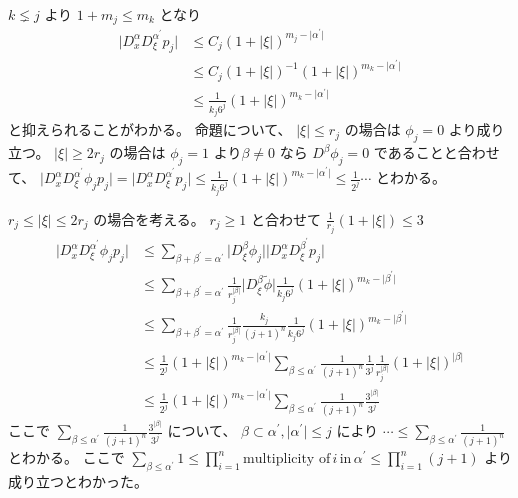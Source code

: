 \begin{Proof}
\itemprof
  \(k \lneq j\) より \(1 + m_j \leq m_k\) となり
  \begin{align*}
    \lvert D^\alpha_x D^{\alpha^\prime}_\xi p_j \rvert
    &\leq C_j(1 + \lvert \xi \rvert)^{m_j - \lvert \alpha^\prime \rvert} \\
    &\leq C_j(1 + \lvert \xi \rvert)^{-1} (1 + \lvert \xi \rvert)^{m_k - \lvert \alpha^\prime \rvert} \\
    &\leq \frac{1}{k_j 6^j} (1 + \lvert \xi \rvert)^{m_k - \lvert \alpha^\prime \rvert}
  \end{align*}
  と抑えられることがわかる。
  命題について、 \(\lvert \xi \rvert \leq r_j\) の場合は \(\phi_j = 0\) より成り立つ。
  \(\lvert \xi \rvert \geq 2 r_j\) の場合は \(\phi_j = 1\) より\(\beta \not = 0\) なら \(D^\beta \phi_j = 0\) であることと合わせて、 \(\lvert D^\alpha_x D^{\alpha^\prime}_\xi \phi_j p_j \rvert = \lvert D^\alpha_x D^{\alpha^\prime}_\xi p_j \rvert \leq \frac{1}{k_j 6^j} (1 + \lvert \xi \rvert)^{m_k - \lvert \alpha^\prime \rvert} \leq \frac{1}{2^j} \cdots \) とわかる。
  
  \(r_j \leq \lvert \xi \rvert \leq 2 r_j\) の場合を考える。
  \(r_j \geq 1\) と合わせて \(\frac{1}{r_j} (1 + \lvert \xi \rvert) \leq 3\)
  \begin{align*}
    \lvert D^\alpha_x D^{\alpha^\prime}_\xi \phi_j p_j \rvert
    &\leq \sum_{\beta + \beta^\prime = \alpha^\prime} \lvert D^\beta_\xi \phi_j \rvert \lvert D^\alpha_x D^{\beta^\prime}_\xi p_j \rvert \\
    &\leq \sum_{\beta + \beta^{\prime} = \alpha^\prime} \frac{1}{r_j^{\lvert \beta \rvert}} \lvert D^\beta_\xi \tilde{\phi} \rvert \frac{1}{k_j 6^j} (1 + \lvert \xi \rvert)^{m_k - \lvert \beta^\prime \rvert} \\
    &\leq \sum_{\beta + \beta^{\prime} = \alpha^\prime} \frac{1}{r_j^{\lvert \beta \rvert}} \frac{k_j}{(j + 1)^n} \frac{1}{k_j 6^j} (1 + \lvert \xi \rvert)^{m_k - \lvert \beta^\prime \rvert} \\
    &\leq \frac{1}{2^j} (1 + \lvert \xi \rvert)^{m_k - \lvert \alpha^\prime \rvert} \sum_{\beta \leq \alpha^\prime} \frac{1}{(j+1)^n} \frac{1}{3^j} \frac{1}{r_j^{\lvert \beta \rvert}} (1 + \lvert \xi \rvert)^{\lvert \beta \rvert} \\
    & \leq \frac{1}{2^j} (1 + \lvert \xi \rvert)^{m_k - \lvert \alpha^\prime \rvert} \sum_{\beta \leq \alpha^\prime} \frac{1}{(j+1)^n} \frac{3^{\lvert \beta \rvert}}{3^j}
  \end{align*}
  ここで \(\sum_{\beta \leq \alpha^\prime} \frac{1}{(j+1)^n} \frac{3^{\lvert \beta \rvert}}{3^j}\) について、 \(\beta \subset \alpha^\prime , \lvert \alpha^\prime \rvert \leq j\) により \(\cdots \leq \sum_{\beta \leq \alpha^\prime} \frac{1}{(j+1)^n}\) とわかる。
  ここで \(\sum_{\beta \leq \alpha^\prime} 1 \leq \prod_{i=1}^n \text{multiplicity of} \, i \, \text{in} \, \alpha^\prime \leq \prod_{i=1}^n (j + 1)\) より成り立つとわかった。
\end{Proof}

